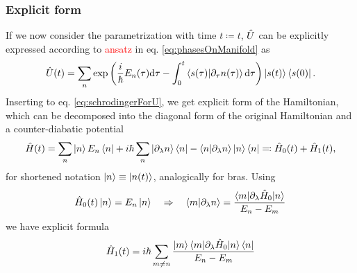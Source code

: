 \subsubsection{Explicit form}
If we now consider the parametrization with time $t\coloneqq t$, $\hat{U}$ can be explicitly expressed according to \textcolor{red}{ansatz} in eq. \ref{eq:phasesOnManifold} as
\begin{equation}
    \hat{U}(t)=\sum_n \exp\left(\frac{i}{\hbar}E_n(\tau)\mathrm{d} \tau - \int_0^t \braket{s(\tau)|\partial_\tau n(\tau)}\mathrm{d}\tau\right)\ket{s(t)}\bra{s(0)}.
    \label{eq:evolutionUduringTransition}
\end{equation}
Inserting to eq. \ref{eq:schrodingerForU}, we get explicit form of the Hamiltonian, which can be decomposed into the diagonal form of the original Hamiltonian and a counter-diabatic potential
\begin{equation}
    \hat{H}(t)=\sum_n \ket{n}E_n\bra{n}+ i\hbar \sum_n\ket{\partial_\lambda n}\bra{n}-\braket{n|\partial_\lambda n}\ket{n}\bra{n}\eqqcolon \hat{H}_0(t)+\hat{H}_1(t),
\end{equation}
for shortened notation $\ket{n}\equiv \ket{n(t)}$, analogically for bras. Using
\begin{equation}
    \hat{H}_0(t)\ket{n}=E_n\ket{n}\quad \Rightarrow\quad \braket{m|\partial_\lambda n}=\frac{\braket{m|\partial_\lambda\hat{H}_0| n}}{E_n-E_m}
\end{equation}
we have explicit formula
\begin{equation}
    \hat{H}_1(t)= i\hbar \sum_{m\neq n}\frac{\ket{m}\braket{m|\partial_\lambda\hat{H}_0| n}\bra{n}}{E_n-E_m}
    \label{eq:explicitCounterDiabaticPotential}
\end{equation}













